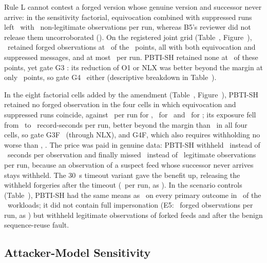 Rule L cannot contest a forged version whose genuine version and successor never arrive: in the sensitivity factorial, equivocation combined with suppressed runs left \sys\ with \VFactPBTIOneFG\ non-legitimate observations per run, whereas B5's reviewer did not release them uncorroborated (\VFactBFiveOneFG). On the registered joint grid (Table~, Figure~), \sys\ retained forged observations at \WAthreePosPoints\ of the \WAthreePoints\ points, all with both equivocation and suppressed messages, and at most \WAthreePmaxOone\ per run. PBTI-SH retained none at \WAthreeSHzeroPoints\ of these points, yet gate G3 \WAthreeGThree: its reduction of O1 or NLX was better beyond the margin at only \WAthreeBetterPoints\ points, so gate G4 \WAthreeGFour\ either (descriptive breakdown in Table~).

In the eight factorial cells added by the amendment (Table~, Figure~), PBTI-SH retained no forged observation in the four cells in which equivocation and suppressed runs coincide, against \WAthreeFPFGOone\ per run for \sys, \WAthreeFBfiveFGOone\ for \Bhist\ and \WAthreeFBfiveEvFGOone\ for \Bev; its exposure fell from \WAthreeFPFGNLX\ to \WAthreeFSHFGNLX\ record-seconds per run, better beyond the margin than \sys\ in all four cells, so gate G3F \WAthreeFGThree\ (through NLX), and G4F, which also requires withholding no worse than \Bhist, \WAthreeFGFour. The price was paid in genuine data: PBTI-SH withheld \WAthreeFSHFGW\ instead of \WAthreeFPFGW\ seconds per observation and finally missed \WAthreeFSHFGOtwo\ instead of \WAthreeFPFGOtwo\ legitimate observations per run, because an observation of a suspect feed whose successor never arrives stays withheld. The 30~s timeout variant gave the benefit up, releasing the withheld forgeries after the timeout (\WAthreeFSHTFGOone\ per run, as \sys). In the scenario controls (Table~), PBTI-SH had the same means as \sys\ on every primary outcome in \WAthreeSSameN\ of the \WAthreeSN\ workloads; it did not contain full impersonation (E5: \WAthreeSEfiveSHOone\ forged observations per run, as \sys) but withheld legitimate observations of forked feeds and after the benign sequence-reuse fault.

\subsection{Attacker-Model Sensitivity}\label{sec:res-attacker}

